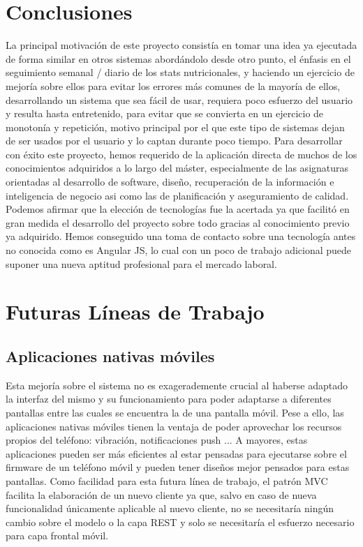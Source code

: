 \documentclass[12pt, a4paper, twoside]{book}
\begin{document}
	\section{Conclusiones}
	La principal motivación de este proyecto consistía en tomar una idea ya ejecutada de forma similar en otros sistemas abordándolo desde otro punto, el énfasis en el seguimiento semanal / diario de los stats nutricionales, y haciendo un ejercicio de mejoría sobre ellos para evitar los errores más comunes de la mayoría de ellos, desarrollando un sistema que sea fácil de usar, requiera poco esfuerzo del usuario y resulta hasta entretenido, para evitar que se convierta en un ejercicio de monotonía y repetición, motivo principal por el que este tipo de sistemas dejan de ser usados por el usuario y lo captan durante poco tiempo.	
	Para desarrollar con éxito este proyecto, hemos requerido de la aplicación directa de muchos de los conocimientos adquiridos a lo largo del máster, especialmente de las asignaturas orientadas al desarrollo de software, diseño, recuperación de la información e inteligencia de negocio asi como las de planificación y aseguramiento de calidad.
	Podemos afirmar que la elección de tecnologías fue la acertada ya que facilitó en gran medida el desarrollo del proyecto sobre todo gracias al conocimiento previo ya adquirido. Hemos conseguido una toma de contacto sobre una tecnología antes no conocida como es Angular JS, lo cual con un poco de trabajo adicional puede suponer una nueva aptitud profesional para el mercado laboral.
	\section{Futuras Líneas de Trabajo}
	\subsection{Aplicaciones nativas móviles}
	Esta mejoría sobre el sistema no es exagerademente crucial al haberse adaptado la interfaz del mismo y su funcionamiento para poder adaptarse a diferentes pantallas entre las cuales se encuentra la de una pantalla móvil.
	Pese a ello, las aplicaciones nativas móviles tienen la ventaja de poder aprovechar los recursos propios del teléfono: vibración, notificaciones push ...
	A mayores, estas aplicaciones pueden ser más eficientes al estar pensadas para ejecutarse sobre el firmware de un teléfono móvil y pueden tener diseños mejor pensados para estas pantallas.
	Como facilidad para esta futura línea de trabajo, el patrón MVC facilita la elaboración de un nuevo cliente ya que, salvo en caso de nueva funcionalidad únicamente aplicable al nuevo cliente, no se necesitaría ningún cambio sobre el modelo o la capa REST y solo se necesitaría el esfuerzo necesario para capa frontal móvil.
\end{document}
